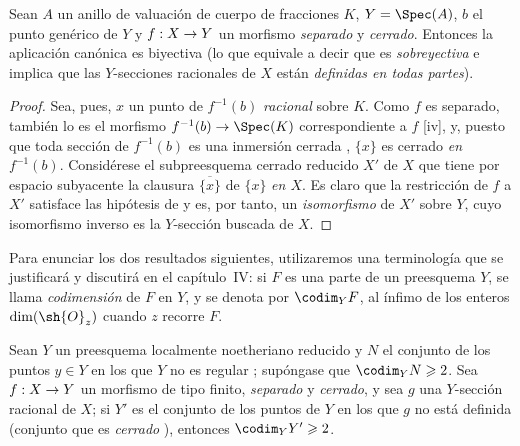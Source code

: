 \documentclass[oneside,10pt]{amsart}
\makeatletter
\renewcommand{\geq}{\geqslant}
\newcommand{\ega@arrow}[2]{\mathchoice{#1}{#2}{#2}{#2}}
\renewcommand{\to}{\ega@arrow{\longrightarrow}{\rightarrow}}
\newcommand{\oldpage}[2][]{\marginnote{\normalfont\footnotesize\textbf{#1}~|~#2}\ignorespaces}
\let\EGAOriginalLabel\label
\renewcommand{\label}[1]{\phantomsection\EGAOriginalLabel{#1}}
\makeatother
\begin{document}

\begin{proposition}[7.3.3]
\label{II.7.3.3}
Sean $A$ un anillo de valuación de cuerpo de fracciones $K$, $Y=\Spec(A)$, $b$ el punto genérico de $Y$ y $f:X\to Y$ un morfismo \emph{separado} y \emph{cerrado}.
Entonces la aplicación canónica  es biyectiva \textup{(lo que equivale a decir que es \emph{sobreyectiva} e implica que las $Y$-secciones racionales de $X$ están \emph{definidas en todas partes})}.
\end{proposition}

\begin{proof}
Sea, pues, $x$ un punto de $f^{-1}(b)$ \emph{racional} sobre $K$.
Como $f$ es separado, también lo es el morfismo $f^{-1}(b)\to\Spec(K)$ correspondiente a $f$ [iv], y, puesto que toda sección de $f^{-1}(b)$ es una inmersión cerrada , $\{x\}$ es cerrado \emph{en $f^{-1}(b)$}.
Considérese el subpreesquema cerrado reducido $X'$ de $X$ que tiene por espacio subyacente la clausura $\overline{\{x\}}$ de $\{x\}$ \emph{en $X$}.
Es claro que la restricción de $f$ a $X'$ satisface las hipótesis de  y es, por tanto, un \emph{isomorfismo} de $X'$ sobre $Y$, cuyo isomorfismo inverso es la $Y$-sección buscada de $X$.
\end{proof}

\begin{env}[7.3.4]
\label{II.7.3.4}
Para enunciar los dos resultados siguientes, utilizaremos una terminología que se justificará y discutirá en el capítulo~IV:
si $F$ es una parte
\oldpage[II]{144}
de un preesquema $Y$, se llama \emph{codimensión} de $F$ en $Y$, y se denota por $\codim_Y F$, al ínfimo de los enteros $\dim(\sh{O}_z)$ cuando $z$ recorre $F$.
\end{env}

\begin{corollary}[7.3.5]
\label{II.7.3.5}
Sean $Y$ un preesquema localmente noetheriano reducido y $N$ el conjunto de los puntos $y\in Y$ en los que $Y$ no es regular ;
supóngase que $\codim_Y N\geq2$.
Sea $f:X\to Y$ un morfismo de tipo finito, \emph{separado} y \emph{cerrado}, y sea $g$ una $Y$-sección racional de $X$;
si $Y'$ es el conjunto de los puntos de $Y$ en los que $g$ no está definida \textup{(conjunto que es \emph{cerrado} )}, entonces $\codim_Y Y'\geq2$.
\end{corollary}
\end{document}
